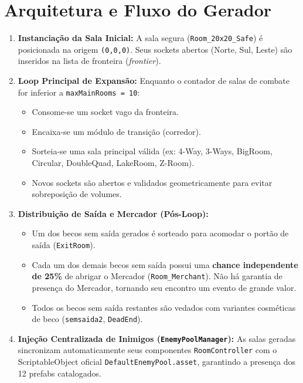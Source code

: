 \documentclass[a4paper,12pt]{report}
\begin{document}
\section{Arquitetura e Fluxo do Gerador}
\begin{enumerate}
    \item \textbf{Instanciação da Sala Inicial:} A sala segura (\texttt{Room\_20x20\_Safe}) é posicionada na origem \texttt{(0,0,0)}. Seus sockets abertos (Norte, Sul, Leste) são inseridos na lista de fronteira (\textit{frontier}).
    \item \textbf{Loop Principal de Expansão:} Enquanto o contador de salas de combate for inferior a \texttt{maxMainRooms = 10}:
    \begin{itemize}
        \item Consome-se um socket vago da fronteira.
        \item Encaixa-se um módulo de transição (corredor).
        \item Sorteia-se uma sala principal válida (ex: 4-Way, 3-Ways, BigRoom, Circular, DoubleQuad, LakeRoom, Z-Room).
        \item Novos sockets são abertos e validados geometricamente para evitar sobreposição de volumes.
    \end{itemize}
    \item \textbf{Distribuição de Saída e Mercador (Pós-Loop):}
    \begin{itemize}
        \item Um dos becos sem saída gerados é sorteado para acomodar o portão de saída (\texttt{ExitRoom}).
        \item Cada um dos demais becos sem saída possui uma \textbf{chance independente de 25\%} de abrigar o Mercador (\texttt{Room\_Merchant}). Não há garantia de presença do Mercador, tornando seu encontro um evento de grande valor.
        \item Todos os becos sem saída restantes são vedados com variantes cosméticas de beco (\texttt{semsaida2}, \texttt{DeadEnd}).
    \end{itemize}
    \item \textbf{Injeção Centralizada de Inimigos (\texttt{EnemyPoolManager}):} As salas geradas sincronizam automaticamente seus componentes \texttt{RoomController} com o ScriptableObject oficial \texttt{DefaultEnemyPool.asset}, garantindo a presença dos 12 prefabs catalogados.
\end{enumerate}

\end{document}
